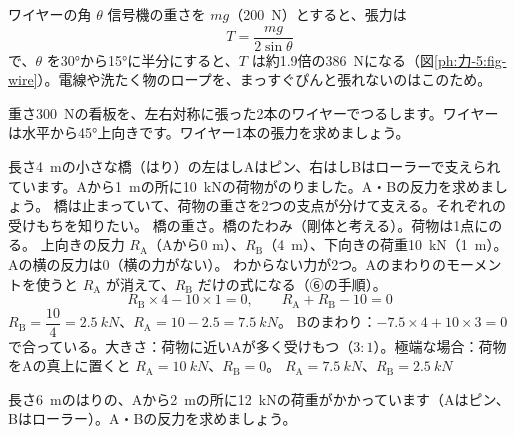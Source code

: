 \begin{phbaisuru}[半分]{ワイヤーの角 $\theta$}
信号機の重さを $mg$（\qty{200}{N}）とすると、張力は
\[ T=\frac{mg}{2\sin\theta} \]
で、$\theta$ を30°から15°に半分にすると、$T$ は約1.9倍の\qty{386}{N}になる（図\ref{ph:力-5:fig-wire}）。電線や洗たく物のロープを、まっすぐぴんと張れないのはこのため。
\par\vspace{2pt}
\centering
{}
\label{ph:力-5:fig-wire}
\end{phbaisuru}
\begin{jibun}
重さ\qty{300}{N}の看板を、左右対称に張った2本のワイヤーでつるします。ワイヤーは水平から45°上向きです。ワイヤー1本の張力を求めましょう。
\end{jibun}

\begin{phreidai}[橋の支点の反力]
\label{ph:力-5:ex5}長さ\qty{4}{m}の小さな橋（はり）の左はしAはピン、右はしBはローラーで支えられています。Aから\qty{1}{m}の所に\qty{10}{kN}の荷物がのりました。A・Bの反力を求めましょう。
\phbamen
橋は止まっていて、荷物の重さを2つの支点が分けて支える。それぞれの受けもちを知りたい。
\phmushi
橋の重さ。橋のたわみ（剛体と考える）。荷物は1点にのる。
\phzu
上向きの反力 $R_{\mathrm A}$（Aから0 m）、$R_{\mathrm B}$（\qty{4}{m}）、下向きの荷重\qty{10}{kN}（\qty{1}{m}）。Aの横の反力は0（横の力がない）。
\phriyu
わからない力が2つ。Aのまわりのモーメントを使うと $R_{\mathrm A}$ が消えて、$R_{\mathrm B}$ だけの式になる（⑥の手順）。
\phtateru
\[ R_{\mathrm B}\times4-10\times1=0,\qquad R_{\mathrm A}+R_{\mathrm B}-10=0 \]
\phtoku
$R_{\mathrm B}=\dfrac{10}{4}=\qty{2.5}{kN}$、$R_{\mathrm A}=10-2.5=\qty{7.5}{kN}$。
\phtashikame
Bのまわり：$-7.5\times4+10\times3=0$ で合っている。\quad 大きさ：荷物に近いAが多く受けもつ（$3:1$）。\quad 極端な場合：荷物をAの真上に置くと $R_{\mathrm A}=\qty{10}{kN}$、$R_{\mathrm B}=0$。
\kotae $R_{\mathrm A}=\qty{7.5}{kN}$、$R_{\mathrm B}=\qty{2.5}{kN}$
\end{phreidai}
\begin{jibun}
長さ\qty{6}{m}のはりの、Aから\qty{2}{m}の所に\qty{12}{kN}の荷重がかかっています（Aはピン、Bはローラー）。A・Bの反力を求めましょう。
\end{jibun}

